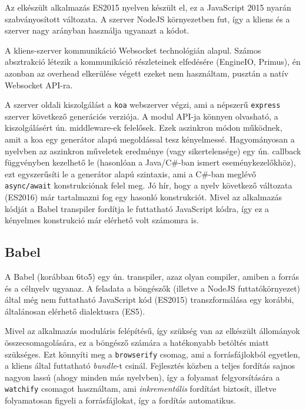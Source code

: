 \documentclass[11pt]{article}
\begin{document}
Az elkészült alkalmazás ES2015 \cite{es2015} nyelven készült el, ez a JavaScript 2015 nyarán
szabványosított változata. A szerver NodeJS \cite{node} környezetben fut, így a kliens és
a szerver nagy arányban használja ugyanazt a kódot.

A kliens-szerver kommunikáció Websocket \cite{websocket} technológián alapul.
Számos absztrakció létezik a kommunikáció részleteinek elfedésére (EngineIO, Primus),
én azonban az overhead elkerülése végett ezeket nem használtam, pusztán
a natív Websocket API-ra.

A szerver oldali kiszolgálást a \texttt{koa}\cite{koa} webszerver végzi, ami a népszerű \texttt{express}\cite{express}
szerver következő generációs verziója. A modul API-ja könnyen olvasható,
a kiszolgálásért ún. middleware-ek felelősek. Ezek aszinkron módon működnek,
amit a koa egy generátor alapú megoldással tesz kényelmessé.
Hagyományosan a nyelvben az aszinkron műveletek eredménye (vagy sikertelensége)
egy ún. callback függvényben kezelhető le (hasonlóan a Java/C\#-ban ismert eseménykezelőkhöz),
ezt egyszerűsíti le a generátor alapú szintaxis, ami a C\#-ban meglévő \texttt{async/await}\cite{csasync}
konstrukciónak felel meg. Jó hír, hogy a nyelv következő változata (ES2016) már
tartalmazni fog egy hasonló konstrukciót\cite{jsasync}.
Mivel az alkalmazás kódját a Babel transpiler fordítja le futtatható JavaScript
kódra, így ez a kényelmes konstrukció már elérhető volt számomra is.

\subsection{Babel}

A Babel\cite{babel} (korábban 6to5\cite{6to5}) egy ún. transpiler, azaz olyan compiler, amiben a forrás
és a célnyelv ugyanaz. A feladata a böngészők (illetve a NodeJS futtatókörnyezet)
által még nem futtatható JavaScript kód (ES2015) transzformálása egy korábbi,
általánosan elérhető dialektusra (ES5).

Mivel az alkalmazás moduláris felépítésű, így szükség van az elkészült állományok
összecsomagolására, ez a böngésző számára a hatékonyabb betöltés miatt szükséges.
Ezt könnyíti meg a \texttt{browserify}\cite{browserify} csomag, ami a forrásfájlokból egyetlen, a kliens
által futtatható \emph{bundle}-t csinál.
Fejlesztés közben a teljes fordítás sajnos nagyon lassú (ahogy minden más nyelvben),
így a folyamat felgyorsítására a \texttt{watchify}\cite{watchify} csomagot használtam, ami \emph{inkrementális}
fordítást biztosít, illetve folyamatosan figyeli a forrásfájlokat,
így a fordítás automatikus.
\end{document}
